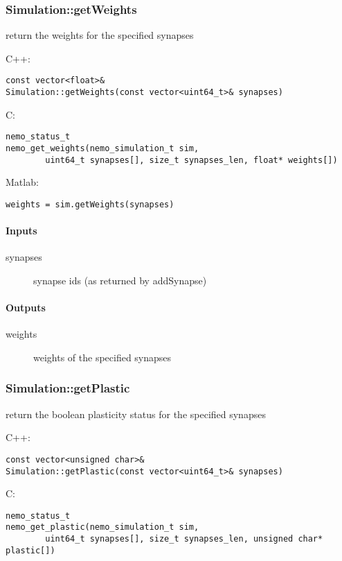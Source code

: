 \clearpage
\subsubsection*{Simulation::getWeights}
\label{fn: getWeights}
return the weights for the specified synapses


\noindent C++:
\begin{lstlisting}[aboveskip=2pt]
const vector<float>&
Simulation::getWeights(const vector<uint64_t>& synapses)
\end{lstlisting}

\noindent C:
\begin{lstlisting}[aboveskip=2pt]
nemo_status_t
nemo_get_weights(nemo_simulation_t sim, 
        uint64_t synapses[], size_t synapses_len, float* weights[])
\end{lstlisting}

\noindent Matlab:
\begin{lstlisting}[aboveskip=2pt]
weights = sim.getWeights(synapses)
\end{lstlisting}
\paragraph{Inputs}
\begin{description}
\item[synapses] synapse ids (as returned by addSynapse)
\end{description}
\paragraph{Outputs}
\begin{description}
\item[weights] weights of the specified synapses
\end{description}

\clearpage
\subsubsection*{Simulation::getPlastic}
\label{fn: getPlastic}
return the boolean plasticity status for the specified synapses


\noindent C++:
\begin{lstlisting}[aboveskip=2pt]
const vector<unsigned char>&
Simulation::getPlastic(const vector<uint64_t>& synapses)
\end{lstlisting}

\noindent C:
\begin{lstlisting}[aboveskip=2pt]
nemo_status_t
nemo_get_plastic(nemo_simulation_t sim, 
        uint64_t synapses[], size_t synapses_len, unsigned char* plastic[])
\end{lstlisting}

